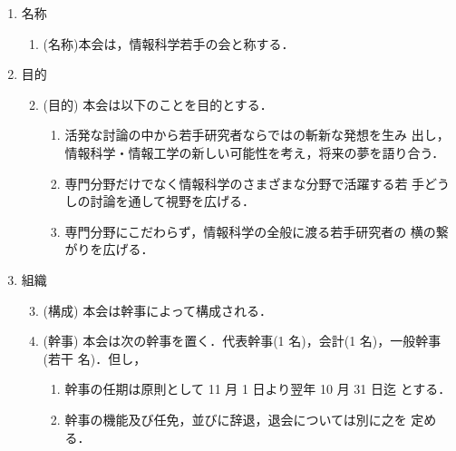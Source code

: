\maketitle
%
\begin{enumerate}
%
\item 名称\\
%
\begin{enumerate}
\item (名称)本会は，情報科学若手の会と称する．\\
\end{enumerate}
%
\item	目的\\
%
\begin{enumerate}
\setcounter{enumii}{1}
\item \label{mokuteki} (目的) 本会は以下のことを目的とする．\\

	\begin{enumerate}
	\item	活発な討論の中から若手研究者ならではの斬新な発想を生み
出し，情報科学・情報工学の新しい可能性を考え，将来の夢を語り合う．\\
	\item	専門分野だけでなく情報科学のさまざまな分野で活躍する若
手どうしの討論を通して視野を広げる．\\
	\item	専門分野にこだわらず，情報科学の全般に渡る若手研究者の
横の繋がりを広げる．\\
	\end{enumerate}
%
\end{enumerate}
%
\item	組織\\
\begin{enumerate}
\setcounter{enumii}{2}
\item	(構成) 本会は幹事によって構成される．\\
%
\item	(幹事) 本会は次の幹事を置く．代表幹事(1 名)，会計(1 名)，一般幹事(若干 
名)．但し，\\
\begin{enumerate}
	\item	幹事の任期は原則として 11 月 1 日より翌年 10 月 31 日迄
とする．\\
	\item	幹事の機能及び任免，並びに辞退，退会については別に之を
定める．\\
\end{enumerate}
%


\end{enumerate}
\end{enumerate}
